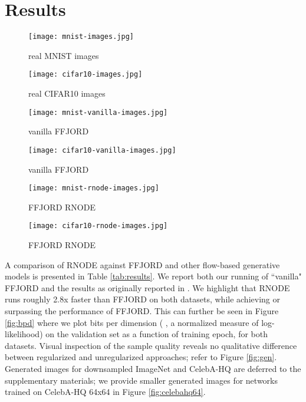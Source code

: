 \documentclass{article}
\theoremstyle{definition}
\theoremstyle{remark}
\begin{document}
\section{Results}
\begin{figure*}
  \vskip 0.2in
  \centering
    \begin{subfigure}[t]{.45\textwidth}
    \centering
    \texttt{[image: mnist-images.jpg]}
    \caption{real MNIST images}\label{fig:realmnist}
    \end{subfigure} 
        \begin{subfigure}[t]{.45\textwidth}
    \centering
    \texttt{[image: cifar10-images.jpg]}
    \caption{real CIFAR10 images}\label{fig:realcifar10}
    \end{subfigure} 
        \begin{subfigure}[t]{.45\textwidth}
    \centering
    \texttt{[image: mnist-vanilla-images.jpg]}
    \caption{vanilla FFJORD}\label{fig:munreg}
    \end{subfigure}
\begin{subfigure}[t]{.45\textwidth}
    \centering
    \texttt{[image: cifar10-vanilla-images.jpg]}
    \caption{vanilla FFJORD}\label{fig:cunreg}
    \end{subfigure}
        \begin{subfigure}[t]{.45\textwidth}
    \centering
    \texttt{[image: mnist-rnode-images.jpg]}
    \caption{FFJORD RNODE}\label{fig:mreg}
    \end{subfigure}
\begin{subfigure}[t]{.45\textwidth}
    \centering
    \texttt{[image: cifar10-rnode-images.jpg]}
    \caption{FFJORD RNODE}\label{fig:creg}
    \end{subfigure}
    \caption{Quality of generated samples samples with and without
    regularization on MNIST, left, and CIFAR10, right.}\label{fig:gen}
    \vskip -0.2in
\end{figure*}
A comparison of RNODE against FFJORD and other flow-based generative models is presented in Table \ref{tab:results}. We
report both our running of ``vanilla" FFJORD and the results as originally reported
in \citep{grathwohl_ffjord}. We highlight that RNODE  runs roughly 2.8x faster than FFJORD on both datasets, while achieving or surpassing the performance of FFJORD. This can further be seen in
Figure \ref{fig:bpd} where we plot bits per dimension ( , a normalized measure of
log-likelihood) on the validation set as a function of training epoch, for both
datasets. Visual inspection of the sample quality reveals no qualitative difference between regularized and unregularized approaches; refer to Figure \ref{fig:gen}. 
Generated images for downsampled ImageNet and CelebA-HQ are deferred to the
supplementary materials; we provide smaller generated images for networks
trained on CelebA-HQ 64x64 in
Figure \ref{fig:celebahq64}.
\end{document}
